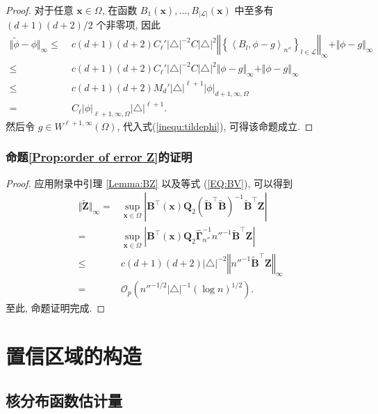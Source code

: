 \documentclass[a4paper,openay,14pt]{ctexbook}
\numberwithin{equation}{section}
\numberwithin{lem}{section}
\newcommand{\chapterwithfancyheader}[1]{  
    \chapter{#1} %
    \thispagestyle{fancy} %
}
\begin{document}
\begin{proof}
对于任意 $\boldsymbol{x} \in \Omega$, 在函数 $B_1(\boldsymbol{x}), \dots, B_{\vert \mathcal{L} \vert}(\boldsymbol{x})$ 中至多有 $(d+1)(d+2)/2$ 个非零项, 因此
\begin{align*}
\Vert \tilde{\phi} - \phi\Vert_{\infty}
\leq&\;
c(d+1)(d+2)C_\ell'
\vert\triangle\vert^{-2}
C\vert\triangle\vert^{2} 
\left\Vert
\left\{
\left\langle B_l,\phi-g\right\rangle_{n''}
\right\}_{l\in\mathcal{L}}
\right\Vert_{\infty}
+ \Vert\phi-g\Vert_{\infty}\\
\leq&\;
c(d+1)(d+2)C_\ell'
\vert\triangle\vert^{-2}
C\vert\triangle\vert^{2}
\Vert \phi-g\Vert_{\infty} 
+ \Vert\phi-g\Vert_{\infty}\\
\leq&\;
c(d+1)(d+2)M_d'
\vert\triangle\vert^{\ell+1}
\vert \phi\vert_{d+1,\infty,\Omega}\\
=&\;
C_\ell 
\vert\phi\vert_{\ell+1,\infty,\Omega}
\vert \triangle\vert^{\ell+1}.
\end{align*}
然后令 $g \in W^{\ell+1,\infty}(\Omega)$, 代入式(\ref{inequ:tildephi}), 可得该命题成立.
\end{proof}

\subsection{命题\ref{Prop:order of error Z}的证明}
\begin{proof}
    应用附录中引理 \ref{Lemma:BZ} 以及等式 (\ref{EQ:BV}), 可以得到
\begin{align*}
    \Vert \tilde{\boldsymbol{Z}}\Vert_{\infty} = &\sup_{\boldsymbol{x}\in\Omega}\left\vert\boldsymbol{B}^{\top}(\boldsymbol{x})\boldsymbol{Q}_2\left(\tilde{\boldsymbol{B}}^{\top}\tilde{\boldsymbol{B}}\right)^{-1}\tilde{\boldsymbol{B}}^{\top}\boldsymbol{Z}\right\vert\\
    =&\sup_{\boldsymbol{x}\in\Omega}\left\vert{\boldsymbol{B}}^{\top}(\boldsymbol{x})\boldsymbol{Q}_2\hat{\bm{\Gamma}}^{-1}_{n''}{n''^{-1}\tilde{\boldsymbol{B}}}^{\top}\boldsymbol{Z}\right\vert\\
    \leq & c(d+1)(d+2)\vert\triangle\vert^{-2}\left\Vert n''^{-1}\tilde{\boldsymbol{B}}^{\top}\boldsymbol{Z}\right\Vert_{\infty}\\
    =& \mathcal{O}_p\left(n''^{-1/2}\vert\triangle\vert^{-1}(\log n)^{1/2}\right).
\end{align*}
至此, 命题证明完成.
\end{proof}

\chapterwithfancyheader{置信区域的构造}\label{SEC: estimate}

\section{核分布函数估计量}\label{KDE}
\end{document}
